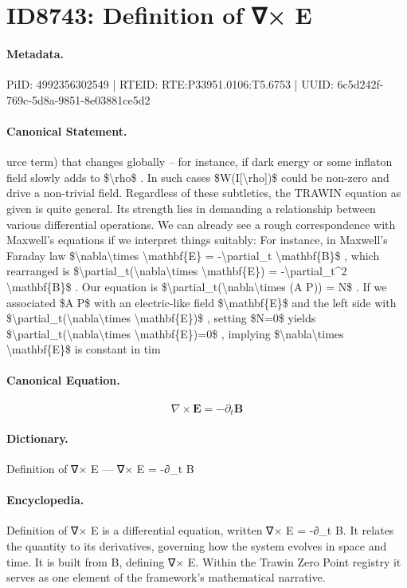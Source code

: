 \section*{ID8743: Definition of ∇× E}
\paragraph{Metadata.}
PiID: 4992356302549 | RTEID: RTE:P33951.0106:T5.6753 | UUID: 6c5d242f-769c-5d8a-9851-8e03881ce5d2

\paragraph{Canonical Statement.}
urce term) that changes globally – for instance, if dark energy or some inflaton field slowly adds to \$\textbackslash{}rho\$ . In such cases \$W(I[\textbackslash{}rho])\$ could be non-zero and drive a non-trivial field. Regardless of these subtleties, the TRAWIN equation as given is quite general. Its strength lies in demanding a relationship between various differential operations. We can already see a rough correspondence with Maxwell’s equations if we interpret things suitably: For instance, in Maxwell’s Faraday law \$\textbackslash{}nabla\textbackslash{}times \textbackslash{}mathbf\{E\} = -\textbackslash{}partial\_t \textbackslash{}mathbf\{B\}\$ , which rearranged is \$\textbackslash{}partial\_t(\textbackslash{}nabla\textbackslash{}times \textbackslash{}mathbf\{E\}) = -\textbackslash{}partial\_t\textasciicircum{}2 \textbackslash{}mathbf\{B\}\$ . Our equation is \$\textbackslash{}partial\_t(\textbackslash{}nabla\textbackslash{}times (A P)) = N\$ . If we associated \$A P\$ with an electric-like field \$\textbackslash{}mathbf\{E\}\$ and the left side with \$\textbackslash{}partial\_t(\textbackslash{}nabla\textbackslash{}times \textbackslash{}mathbf\{E\})\$ , setting \$N=0\$ yields \$\textbackslash{}partial\_t(\textbackslash{}nabla\textbackslash{}times \textbackslash{}mathbf\{E\})=0\$ , implying \$\textbackslash{}nabla\textbackslash{}times \textbackslash{}mathbf\{E\}\$ is constant in tim

\paragraph{Canonical Equation.}
\[
\nabla\times \mathbf{E} = -\partial_t \mathbf{B}
\]

\paragraph{Dictionary.}
Definition of ∇× E — ∇× E = -∂\_t B

\paragraph{Encyclopedia.}
Definition of ∇× E is a differential equation, written ∇× E = -∂\_t B. It relates the quantity to its derivatives, governing how the system evolves in space and time. It is built from B, defining ∇× E. Within the Trawin Zero Point registry it serves as one element of the framework's mathematical narrative.
